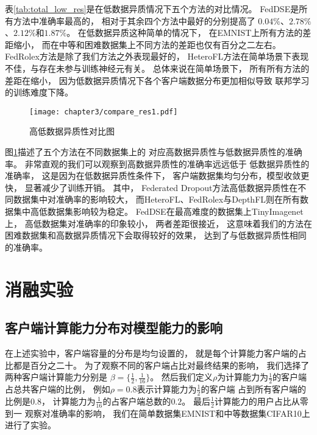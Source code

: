 表\ref{tab:total_low_res}是在低数据异质情况下五个方法的对比情况。
FedDSE是所有方法中准确率最高的，
相对于其余四个方法中最好的分别提高了
$0.04\%$、$2.78 \%$、$2.12 \%$和$1.87\%$。
在低数据异质这种简单的情况下，
在EMNIST上所有方法的差距缩小，
而在中等和困难数据集上不同方法的差距也仅有百分之二左右。
FedRolex方法是除了我们方法之外表现最好的，
HeteroFL方法在简单场景下表现不佳，与存在未参与训练神经元有关。
总体来说在简单场景下，
所有所有方法的差距在缩小，
因为低数据异质情况下各个客户端数据分布更加相似导致
联邦学习的训练难度下降。

\begin{figure}[thbp]
    \centering
    \texttt{[image: chapter3/compare\_res1.pdf]}
    \caption{\label{fig:3-3-compare_res}高低数据异质性对比图}
\end{figure}
图\ref{fig:3-3-compare_res}描述了五个方法在不同数据集上的
对应高数据异质性与低数据异质性的准确率。
非常直观的我们可以观察到高数据异质性的准确率远远低于
低数据异质性的准确率，
这是因为在低数据异质性条件下，
客户端数据集均匀分布，模型收敛更快，
显著减少了训练开销。
其中，
Federated Dropout方法高低数据异质性在不同数据集中对准确率的影响较大，
而HeteroFL、FedRolex与DepthFL则在所有数据集中高低数据集影响较为稳定。
FedDSE在最高难度的数据集上TinyImagenet上，
高低数据集对准确率的印象较小，
两者差距很接近，
这意味着我们的方法在困难数据集和高数据异质情况下会取得较好的效果，
达到了与低数据异质性相同的准确率。

\section{消融实验}
\subsection{客户端计算能力分布对模型能力的影响}
在上述实验中，客户端容量的分布是均匀设置的，
就是每个计算能力客户端的占比都是百分之二十。
为了观察不同的客户端占比对最终结果的影响，
我们选择了两种客户端计算能力分别是
$\beta = \{ \frac{1}{2} , \frac{1}{16}  \}$。
然后我们定义$\rho$为计算能力为$\frac{1}{2}$的客户端
占总共客户端的比例，
例如$\rho = 0.8$表示计算能力为$\frac{1}{2}$的客户端
占到所有客户端的比例是$0.8$，
计算能力为$\frac{1}{16}$的占客户端总数的$0.2$。
最后$\frac{1}{2}$计算能力的用户占比从零到一
观察对准确率的影响，
我们在简单数据集EMNIST和中等数据集CIFAR10上进行了实验。

